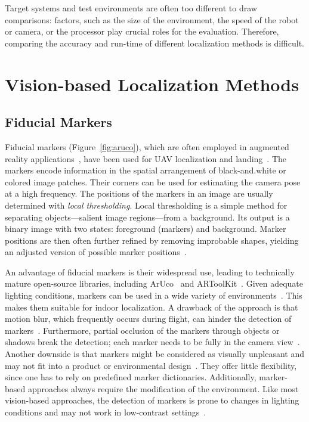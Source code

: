 \documentclass[11pt]{report}
\begin{document}
Target systems and test environments are often too different to draw
comparisons: factors, such as the size of the environment, the speed
of the robot or camera, or the processor play crucial roles for the
evaluation. Therefore, comparing the accuracy and run-time of
different localization methods is difficult.


\section{Vision-based Localization Methods}

\subsection{Fiducial Markers}
\label{sec:fiducialmarkers}

Fiducial markers (Figure~\ref{fig:aruco}), which are often employed in
augmented reality
applications~\cite{kato1999marker,garrido2014automatic}, have been
used for UAV localization and
landing~\cite{eberli2011vision,bebop2015}. The markers encode
information in the spatial arrangement of black-and.white or colored
image patches. Their corners can be used for estimating the camera
pose at a high frequency. The positions of the markers in an image are
usually determined with \emph{local thresholding}. Local thresholding
is a simple method for separating objects---salient image
regions---from a background. Its output is a binary image with two
states: foreground (markers) and background. Marker positions are then
often further refined by removing improbable shapes, yielding an
adjusted version of possible marker positions~\cite{aruco2014}.

An advantage of fiducial markers is their widespread use, leading to
technically mature open-source libraries, including
ArUco~\cite{aruco2014} and ARToolKit~\cite{kato1999marker}. Given
adequate lighting conditions, markers can be used in a wide variety of
environments~\cite{hornecker2005using}. This makes them suitable for
indoor localization. A drawback of the approach is that motion blur,
which frequently occurs during flight, can hinder the detection of
markers~\cite{albasiouny2015mean}. Furthermore, partial occlusion of
the markers through objects or shadows break the detection; each
marker needs to be fully in the camera
view~\cite{hornecker2005using}. Another downside is that markers might
be considered as visually unpleasant and may not fit into a product or
environmental design~\cite{chu2013halftone}. They offer little
flexibility, since one has to rely on predefined marker
dictionaries. Additionally, marker-based approaches always require the
modification of the environment. Like most vision-based approaches,
the detection of markers is prone to changes in lighting conditions
and may not work in low-contrast settings~\cite{hornecker2005using}.
\end{document}
